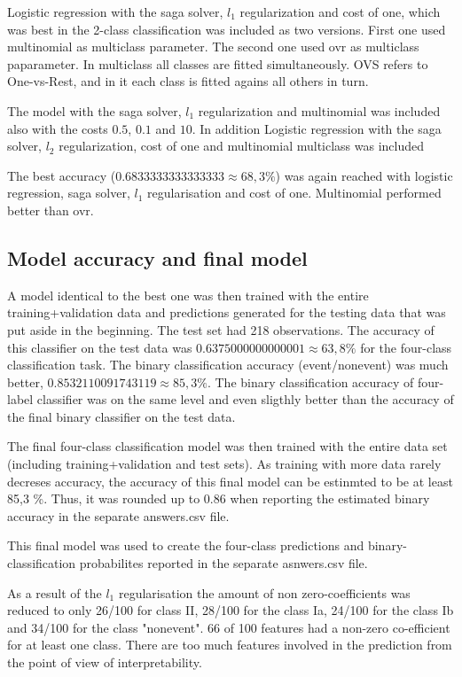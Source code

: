 \documentclass[a4size, 12pt]{report}
\begin{document}
	Logistic regression  with the saga solver, $l_1$ regularization and cost of one, which was best in the 2-class classification was included as two versions. First one used multinomial as multiclass parameter. The second one used ovr as multiclass paparameter. In multiclass all classes are fitted simultaneously. OVS refers to One-vs-Rest, and in it each class is fitted agains all others in turn. 
	
The model with the saga solver, $l_1$ regularization and multinomial was included also with the costs $0.5$, $0.1$ and $10$. 	In addition Logistic regression with the saga solver, $l_2$ regularization, cost of one and multinomial multiclass was included
	
The best accuracy ($0.6833333333333333 \approx 68,3 \%$) was again reached with logistic regression, saga solver, $l_1$ regularisation and cost of one. Multinomial performed better than ovr. 
	
\subsection*{Model accuracy and final model}

	A model identical to the best one was then trained with the entire training+validation data and predictions generated for the testing data that was put aside in the beginning. The test set had 218 observations. The accuracy of this classifier on the test data was $0.6375000000000001 \approx 63,8 \% $ for the four-class classification task.	The binary classification accuracy (event/nonevent) was much better, $0.8532110091743119 \approx 85,3 \%$.  The binary classification accuracy of four-label classifier was on the same level and even sligthly better than the accuracy of the final binary classifier on the test data.
	
	The final four-class classification model was then trained with the entire data set (including training+validation and test sets). As training with more data rarely decreses accuracy, the accuracy of this final model can be estinmted to be at least 85,3 \%. Thus, it was rounded up to 0.86 when reporting the estimated binary accuracy in the separate answers.csv file.
	
	This final model was used to create the four-class predictions and binary-classification probabilites reported in the separate asnwers.csv file.
	
		As a result of the $l_1$ regularisation the amount of non zero-coefficients was reduced to only 26/100 for class II, 28/100 for the class Ia, 24/100 for the class Ib and 34/100 for the class "nonevent". 66 of 100 features had a non-zero co-efficient for at least one class. There are too much features involved in the prediction from the point of view of interpretability. 
	
\end{document}
